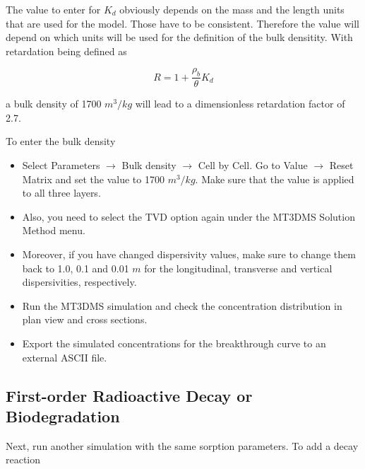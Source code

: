 The value to enter for $K_d$ obviously depends on the mass and the length units 
that are used for the model. Those have to be consistent. 
Therefore the value will depend on which units will be used for the definition
of the bulk densitity. With retardation being defined as

\begin{equation}
R = 1 + \frac{\rho_b}{\theta} K_d
\end{equation}

a bulk density of 1700  $m^3/kg$ will lead to a dimensionless retardation factor
of 2.7. 

To enter the bulk density 

\begin{itemize}

\item Select Parameters  $\rightarrow$ Bulk density
$\rightarrow$ Cell by Cell. Go to Value $\rightarrow$ Reset Matrix and set
the value to  1700  $m^3/kg$. Make sure that the value is applied to all three
layers.

\item Also, you need to select the TVD option
again under the MT3DMS Solution Method menu. 

\item  Moreover, if you have changed
dispersivity values, make sure to change them back to 1.0, 0.1 and 0.01 $m$ for the
longitudinal, transverse and vertical dispersivities, respectively.

\item Run the MT3DMS simulation and check the concentration distribution in plan view and
cross sections. 

\item Export the simulated concentrations for the breakthrough curve 
to an external ASCII file.


\end{itemize}

\subsection{First-order Radioactive Decay or Biodegradation}

Next, run another simulation with the same sorption parameters.
To add a decay reaction

